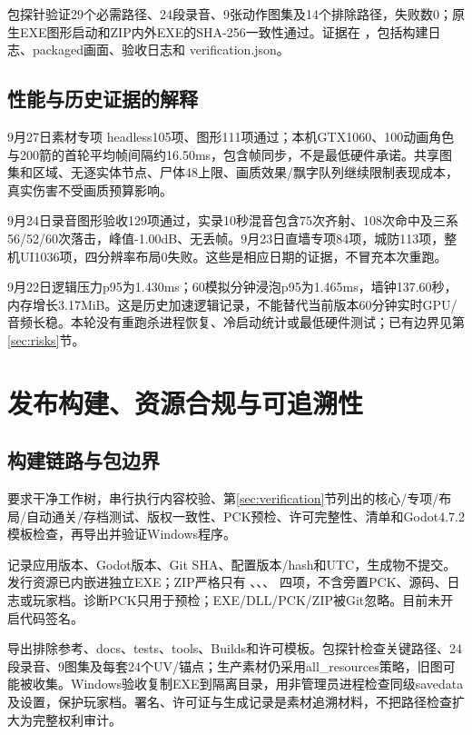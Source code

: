 \documentclass[UTF8,a4paper,11pt,fontset=windows]{ctexart}
\newcommand{\nextsection}[1]{\par\bigskip\section{#1}}
\begin{document}
包探针验证29个必需路径、24段录音、9张动作图集及14个排除路径，失败数0；原生EXE图形启动和ZIP内外EXE的SHA-256一致性通过。证据在 ，包括构建日志、packaged画面、验收日志和 verification.json。

\subsection{性能与历史证据的解释}
9月27日素材专项 headless105项、图形111项通过；本机GTX1060、100动画角色与200箭的首轮平均帧间隔约16.50ms，包含帧同步，不是最低硬件承诺。共享图集和区域、无逐实体节点、尸体48上限、画质效果/飘字队列继续限制表现成本，真实伤害不受画质预算影响。

9月24日录音图形验收129项通过，实录10秒混音包含75次齐射、108次命中及三系56/52/60次落击，峰值-1.00dB、无丢帧。9月23日直墙专项84项，城防113项，整机UI1036项，四分辨率布局0失败。这些是相应日期的证据，不冒充本次重跑。

9月22日逻辑压力p95为1.430ms；60模拟分钟浸泡p95为1.465ms，墙钟137.60秒，内存增长3.17MiB。这是历史加速逻辑记录，不能替代当前版本60分钟实时GPU/音频长稳。本轮没有重跑杀进程恢复、冷启动统计或最低硬件测试；已有边界见第\ref{sec:risks}节。


\nextsection{发布构建、资源合规与可追溯性}
\subsection{构建链路与包边界}
 要求干净工作树，串行执行内容校验、第\ref{sec:verification}节列出的核心/专项/布局/自动通关/存档测试、版权一致性、PCK预检、许可完整性、清单和Godot4.7.2模板检查，再导出并验证Windows程序。

 记录应用版本、Godot版本、Git SHA、配置版本/hash和UTC，生成物不提交。发行资源已内嵌进独立EXE；ZIP严格只有 、、、 四项，不含旁置PCK、源码、日志或玩家档。诊断PCK只用于预检；EXE/DLL/PCK/ZIP被Git忽略。目前未开启代码签名。

导出排除参考、docs、tests、tools、Builds和许可模板。包探针检查关键路径、24段录音、9图集及每套24个UV/锚点；生产素材仍采用all\_resources策略，旧图可能被收集。Windows验收复制EXE到隔离目录，用非管理员进程检查同级savedata及设置，保护玩家档。署名、许可证与生成记录是素材追溯材料，不把路径检查扩大为完整权利审计。
\end{document}
